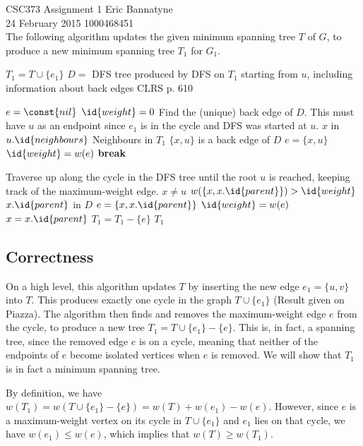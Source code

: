 \documentclass[10pt]{article}
\begin{document}
\noindent CSC373 Assignment 1 \hfill Eric Bannatyne\\
24 February 2015 \hfill 1000468451\\

The following algorithm updates the given minimum spanning tree \(T\) of \(G\), to produce a new minimum spanning tree \(T_1\) for \(G_1\).

\begin{codebox}
\li \(T_1 = T \cup \{e_1\}\)
\li \(D = \) DFS tree produced by DFS on \(T_1\) starting from \(u\), including information about back edges \Comment CLRS p. 610

\li \(e = \const{nil}\)
\li \(\id{weight} = 0\)
\li \Comment Find the (unique) back edge of \(D\).
\li \Comment This must have \(u\) as an endpoint since \(e_1\) is in the cycle and DFS was started at \(u\).
\li \For \(x\) in \(u.\id{neighbours}\) \Comment Neighbours in \(T_1\)
	\Do
	\li \If \(\{x, u\}\) is a back edge of \(D\)
		\Then
		\li \(e = \{x, u\}\)
		\li \(\id{weight} = w(e)\)
		\li \textbf{break}
		\End
	\End

\li \Comment Traverse up along the cycle in the DFS tree until the root \(u\) is reached,
\li \Comment keeping track of the maximum-weight edge.
\li \While \(x \neq u\)
	\Do
	\li \If \(w(\{x, x.\id{parent}\}) > \id{weight}\) \Comment \(x.\id{parent}\) in \(D\)
		\Then
		\li \(e = \{x, x.\id{parent}\}\)
		\li \(\id{weight} = w(e)\)
		\End
	\li \(x = x.\id{parent}\)
	\End
\li \(T_1 = T_1 - \{e\}\)
\li \Return \(T_1\)
\end{codebox}

\subsection*{Correctness}

On a high level, this algorithm updates \(T\) by inserting the new edge \(e_1 = \{u, v\}\) into \(T\). This produces exactly one cycle in the graph \(T \cup \{e_1\}\) (Result given on Piazza). The algorithm then finds and removes the maximum-weight edge \(e\) from the cycle, to produce a new tree \(T_1 = T \cup \{e_1\} - \{e\}\). This is, in fact, a spanning tree, since the removed edge \(e\) is on a cycle, meaning that neither of the endpoints of \(e\) become isolated vertices when \(e\) is removed. We will show that \(T_1\) is in fact a minimum spanning tree.

By definition, we have \(w(T_1) = w(T \cup \{e_1\} - \{e\}) = w(T) + w(e_1) - w(e)\). However, since \(e\) is a maximum-weight vertex on its cycle in \(T \cup \{e_1\}\) and \(e_1\) lies on that cycle, we have \(w(e_1) \leq w(e)\), which implies that \(w(T) \geq w(T_1)\).
\end{document}
